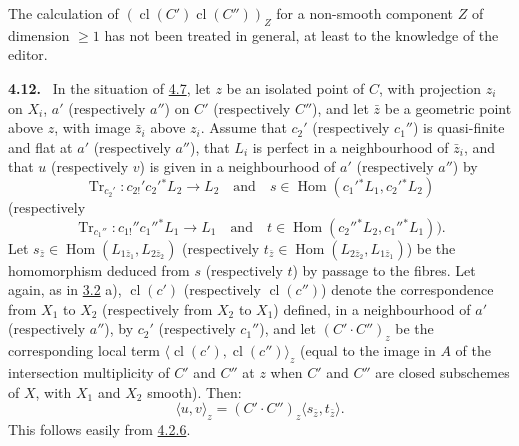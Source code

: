 \documentclass[11pt]{article}
\newenvironment{statement}[1]{\par\medskip\noindent\textbf{#1.}\ }{\par\medskip}
\DeclareMathOperator{\Hom}{Hom}
\providecommand{\cl}{\operatorname{cl}}
\providecommand{\Tr}{\operatorname{Tr}}
\providecommand{\Tr}{\operatorname{Tr}}
\providecommand{\Tr}{\operatorname{Tr}}
\providecommand{\Hom}{\operatorname{Hom}}
\providecommand{\Tr}{\operatorname{Tr}}
\providecommand{\cl}{\operatorname{cl}}
\providecommand{\Hom}{\operatorname{Hom}}
\providecommand{\cl}{\operatorname{cl}}
\providecommand{\Tr}{\operatorname{Tr}}
\begin{document}
The calculation of $(\cl(C')\cl(C''))_Z$ for a non-smooth component $Z$ of dimension $\geq 1$ has not been treated in general, at least to the knowledge of the editor.

\label{sga5:III:statement:4.12}\begin{statement}{4.12}
In the situation of \hyperref[sga5:III:corollary:4.7]{4.7}, let $z$ be an isolated point of $C$, with projection $z_i$ on $X_i$, $a'$ (respectively $a''$) on $C'$ (respectively $C''$), and let $\bar z$ be a geometric point above $z$, with image $\bar z_i$ above $z_i$. Assume that $c_2'$ (respectively $c_1''$) is quasi-finite and flat at $a'$ (respectively $a''$), that $L_i$ is perfect in a neighbourhood of $\bar z_i$, and that $u$ (respectively $v$) is given in a neighbourhood of $a'$ (respectively $a''$) by
\[
\Tr_{c_2'}:c_{2!}'c_2'{}^*L_2\longrightarrow L_2
\quad\text{and}\quad
s\in\Hom(c_1'{}^*L_1,c_2'{}^*L_2)
\]
(respectively
\[
\Tr_{c_1''}:c_{1!}''c_1''{}^*L_1\longrightarrow L_1
\quad\text{and}\quad
t\in\Hom(c_2''{}^*L_2,c_1''{}^*L_1)).
\]
Let $s_{\bar z}\in\Hom(L_{1\bar z_1},L_{2\bar z_2})$ (respectively $t_{\bar z}\in\Hom(L_{2\bar z_2},L_{1\bar z_1})$) be the homomorphism deduced from $s$ (respectively $t$) by passage to the fibres. Let again, as in \hyperref[sga5:III:subsection:3.2]{3.2} a), $\cl(c')$ (respectively $\cl(c'')$) denote the correspondence from $X_1$ to $X_2$ (respectively from $X_2$ to $X_1$) defined, in a neighbourhood of $a'$ (respectively $a''$), by $c_2'$ (respectively $c_1''$), and let $(C'\!\cdot C'')_z$ be the corresponding local term $\langle\cl(c'),\cl(c'')\rangle_z$ (equal to the image in $A$ of the intersection multiplicity of $C'$ and $C''$ at $z$ when $C'$ and $C''$ are closed subschemes of $X$, with $X_1$ and $X_2$ smooth). Then:
\begin{equation}
\tag{4.12.1}\label{sga5:III:equation:4.12.1}
\langle u,v\rangle_z=(C'\!\cdot C'')_z\langle s_{\bar z},t_{\bar z}\rangle.
\end{equation}
This follows easily from \hyperref[sga5:III:equation:4.2.6]{4.2.6}.
\end{statement}
\end{document}
